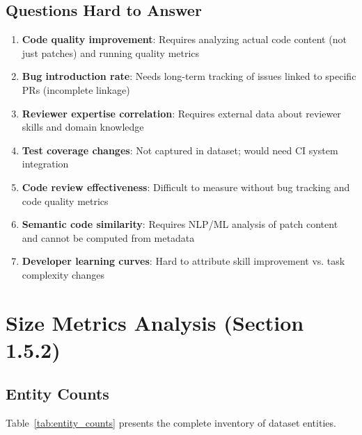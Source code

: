 \documentclass[11pt]{article}
\begin{document}
\subsection{Questions Hard to Answer}

\begin{enumerate}
    \item \textbf{Code quality improvement}: Requires analyzing actual code content (not just patches) and running quality metrics
    \item \textbf{Bug introduction rate}: Needs long-term tracking of issues linked to specific PRs (incomplete linkage)
    \item \textbf{Reviewer expertise correlation}: Requires external data about reviewer skills and domain knowledge
    \item \textbf{Test coverage changes}: Not captured in dataset; would need CI system integration
    \item \textbf{Code review effectiveness}: Difficult to measure without bug tracking and code quality metrics
    \item \textbf{Semantic code similarity}: Requires NLP/ML analysis of patch content and cannot be computed from metadata
    \item \textbf{Developer learning curves}: Hard to attribute skill improvement vs. task complexity changes
\end{enumerate}

\section{Size Metrics Analysis (Section 1.5.2)}

\subsection{Entity Counts}

Table~\ref{tab:entity_counts} presents the complete inventory of dataset entities.
\end{document}
